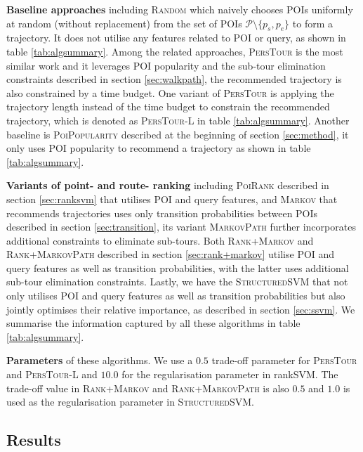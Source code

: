 {\bf Baseline approaches} including \textsc{Random} which naively chooses POIs uniformly at random
(without replacement) from the set of POIs $\mathcal{P} \setminus \{p_s, p_e \}$ to form a trajectory.
It does not utilise any features related to POI or query, as shown in  table \ref{tab:algsummary}.
Among the related approaches, \textsc{PersTour}\cite{ijcai15} is the most similar work and it
leverages POI popularity and the sub-tour elimination constraints described in section \ref{sec:walkpath},
the recommended trajectory is also constrained by a time budget.
One variant of \textsc{PersTour} is applying the trajectory length instead of the time budget to constrain
the recommended trajectory, which is denoted as \textsc{PersTour-L} in table \ref{tab:algsummary}.
Another baseline is \textsc{PoiPopularity} described at the beginning of section \ref{sec:method},
it only uses POI popularity to recommend a trajectory as shown in table \ref{tab:algsummary}.

{\bf Variants of point- and route- ranking} including \textsc{PoiRank} described in section \ref{sec:ranksvm}
that utilises POI and query features, and \textsc{Markov} that recommends trajectories uses only transition
probabilities between POIs described in section \ref{sec:transition}, its variant \textsc{MarkovPath}
further incorporates additional constraints to eliminate sub-tours.
Both \textsc{Rank+Markov} and \textsc{Rank+MarkovPath} described in section \ref{sec:rank+markov}
utilise POI and query features as well as transition probabilities, with the latter uses
additional sub-tour elimination constraints.
Lastly, we have the \textsc{StructuredSVM} that not only utilises POI and query features as well as
transition probabilities but also jointly optimises their relative importance, as described in section \ref{sec:ssvm}.
We summarise the information captured by all these algorithms in table \ref{tab:algsummary}.

{\bf Parameters} of these algorithms.
We use a $0.5$ trade-off parameter for \textsc{PersTour} and \textsc{PersTour-L}
and $10.0$ for the regularisation parameter in rankSVM.
The trade-off value in \textsc{Rank+Markov} and \textsc{Rank+MarkovPath} is also $0.5$
and $1.0$ is used as the regularisation parameter in \textsc{StructuredSVM}.


\subsection{Results}
\label{sec:result}




